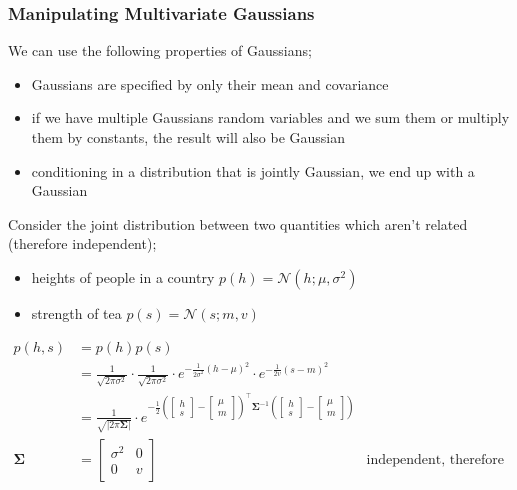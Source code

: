 \documentclass[a4paper, 12pt]{article}
\newcommand{\mat}[1]{\boldsymbol{#1}}
\begin{document}
            \subsubsection*{Manipulating Multivariate Gaussians}
                We can use the following properties of Gaussians;
                \begin{itemize}
                    \itemsep0em
                    \item Gaussians are specified by only their mean and covariance
                    \item if we have multiple Gaussians random variables and we sum them or multiply them by constants, the result will also be Gaussian
                    \item conditioning in a distribution that is jointly Gaussian, we end up with a Gaussian
                \end{itemize}
                Consider the joint distribution between two quantities which aren't related (therefore independent);
                \begin{itemize}
                    \itemsep0em
                    \item heights of people in a country \hfill $p(h) = \mathcal{N}(h; \mu, \sigma^2)$
                    \item strength of tea \hfill $p(s) = \mathcal{N}(s; m, v)$ %
                \end{itemize}
                \begin{align*}
                    p(h, s) & = p(h)p(s) \\
                    & = \frac{1}{\sqrt{2 \pi \sigma^2}} \cdot \frac{1}{\sqrt{2 \pi \sigma^2}} \cdot e^{-\frac{1}{2 \sigma^2}(h - \mu)^2} \cdot e^{-\frac{1}{2 v}(s - m)^2} \\
                    & = \frac{1}{\sqrt{| 2 \pi \mat{\Sigma} |}} \cdot e^{-\frac{1}{2}\left(\begin{bmatrix}
                        h \\ s
                    \end{bmatrix} - \begin{bmatrix}
                        \mu \\ m
                    \end{bmatrix}\right)^\top \mat{\Sigma}^{-1} \left(\begin{bmatrix}
                        h \\ s
                    \end{bmatrix} - \begin{bmatrix}
                        \mu \\ m
                    \end{bmatrix}\right)} \\
                    \mat{\Sigma} & = \begin{bmatrix}
                        \sigma^2 & 0 \\
                        0 & v
                    \end{bmatrix} & \text{independent, therefore diagonal}
                \end{align*}
\end{document}
